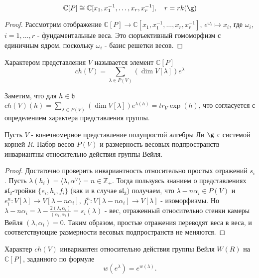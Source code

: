 \documentclass[a4article]{article}
\begin{document}
\begin{lemma}
    \begin{equation}
        \mathbb{C}[P] \cong \mathbb{C}[x_1, x_1^{-1}, \ldots, x_r, x_r^{-1}], \quad r = rk(\g)
    \end{equation}
\end{lemma}
\begin{proof}
    Рассмотрим отображение $\mathbb{C}[P]\rightarrow \mathbb{C}[x_1, x_1^{-1}, \ldots, x_r, x_r^{-1}]$, $e^{\omega_i} \mapsto x_i$, где $\omega_i$, $i=1, \ldots, r$ - фундаментальные веса. Это сюръективный гомоморфизм с единичным ядром, поскольку $\omega_i$ - базис решетки весов.
\end{proof}
\begin{definition}
    Характером представления $V$ называется элемент $\mathbb{C}[P]$
    \begin{equation}
        ch(V)=\sum_{\lambda \in P(V)}(\dim V[\lambda])e^{\lambda}
    \end{equation}
\end{definition}
\begin{remark}
    Заметим, что для $h \in \mathfrak{h}$ $ch(V)(h)=\sum_{\lambda \in P(V)}(\dim V[\lambda])e^{\lambda(h)}=tr_V\exp(h)$, что согласуется с определением характера представления группы.
\end{remark}
\begin{theorem}
    Пусть $V$ - конечномерное представление полупростой алгебры Ли $\g$ с системой корней $R$. Набор весов $P(V)$ и размерность весовых подпространств инвариантны относительно действия группы Вейля.
\end{theorem}
\begin{proof}
    Достаточно проверить инвариантность относительно простых отражений $s_i$. Пусть $\lambda(h_{i})=\langle \lambda, \alpha^{\vee}\rangle = n \in \mathbb{Z}_+$. Тогда пользуясь знанием о представлениях $\mathfrak{sl}_2$-тройки $\{e_i, h_i, f_i\}$ (как и в случае $\mathfrak{sl}_3$) получаем, что $\lambda - n\alpha_i \in P(V)$ и $e_i^n: V[\lambda] \rightarrow V[\lambda-n\alpha_i]$, $f_i^n: V[\lambda-n\alpha_i] \rightarrow V[\lambda]$ - изоморфизмы. Но $\lambda-n\alpha_i = \lambda - \frac{2(\lambda, \alpha_i)}{(\alpha_i, \alpha_i)}=s_i(\lambda)$ - вес, отраженный относительно стенки камеры Вейля $(\lambda, \alpha_i)=0$. Таким образом, простые отражения переводят веса в веса, и соответствующие размерности весовых подпространств не меняются.
\end{proof}
\begin{corollary}
    Характер $ch(V)$ инвариантен относительно действия группы Вейля $W(R)$ на $\mathbb{C}[P]$, заданного по формуле
    \begin{equation}
        w(e^{\lambda})=e^{w(\lambda)}.
    \end{equation}
\end{corollary}
\end{document}

